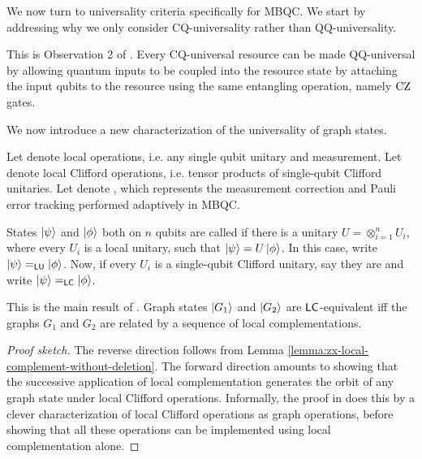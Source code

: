 We now turn to universality criteria specifically for MBQC. We start by addressing why we only consider CQ-universality rather than QQ-universality.

\begin{theorem}
\label{thm:cq-implies-qq}
This is Observation 2 of \cite{MBQC-universal}. Every CQ-universal resource can be made QQ-universal by allowing quantum inputs to be coupled into the resource state by attaching the input qubits to the resource using the same entangling operation,
namely $\text{CZ}$ gates.
\end{theorem}

We now introduce a new characterization of the universality of graph states.

\begin{definition}
Let \term{$\LO$} denote local operations, i.e. any single qubit unitary and measurement. Let \term{$\LC$} denote local Clifford operations, i.e. tensor products of
single-qubit Clifford unitaries. Let \term{$\CC$} denote , which represents the measurement correction and Pauli error tracking performed adaptively in MBQC.

States $\ket\psi$ and $\ket\phi$ both on $n$ qubits are called  if there is a unitary $U = \otimes_{i=1}^n U_i$, where every $U_i$ is a local unitary, such that $\ket\psi = U \ket\phi$. In this case, write $\ket\psi =_{\mathsf{LU}} \ket\phi$. Now, if every $U_i$ is a single-qubit Clifford unitary, say they are  and write $\ket\psi =_{\mathsf{LC}} \ket\phi$.
\end{definition}

\begin{theorem}
This is the main result of \cite{stab-lc-equiv-graph}. Graph states $\ket{G_1}$ and $\ket{G_2}$ are $\LC$-equivalent iff the graphs
$G_1$ and $G_2$ are related by a sequence of local complementations.
\end{theorem}

\begin{proof}[Proof sketch]
The reverse direction follows from Lemma \ref{lemma:zx-local-complement-without-deletion}. The forward direction amounts to showing that the successive application of local complementation generates the orbit of any graph state under local Clifford operations. Informally, the proof in \cite{stab-lc-equiv-graph} does this by a clever characterization of local Clifford operations as graph operations, before showing that all these operations can be implemented using local complementation alone.
\end{proof}


